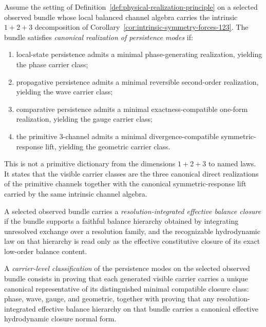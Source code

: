\begin{definition}
\label{def:canonical-sector-generation}
Assume the setting of Definition~\ref{def:physical-realization-principle} on a
selected observed bundle whose local balanced channel algebra carries the
intrinsic \(1+2+3\) decomposition of
Corollary~\ref{cor:intrinsic-symmetry-forces-123}. The bundle satisfies
\emph{canonical realization of persistence modes} if:
\begin{enumerate}[label=(\roman*), leftmargin=2em, itemsep=0.2em]
\item local-state persistence admits a minimal phase-generating realization,
      yielding the phase carrier class;
\item propagative persistence admits a minimal reversible second-order
      realization, yielding the wave carrier class;
\item comparative persistence admits a minimal exactness-compatible one-form
      realization, yielding the gauge carrier class;
\item the primitive \(3\)-channel admits a minimal divergence-compatible
      symmetric-response lift, yielding the geometric carrier class.
\end{enumerate}
This is not a primitive dictionary from the dimensions \(1+2+3\) to named
laws. It states that the visible carrier classes are the three canonical
direct realizations of the primitive channels together with the canonical
symmetric-response lift carried by the same intrinsic channel algebra.
\end{definition}

\begin{definition}
\label{def:resolution-integrated-effective-balance-closure}
A selected observed bundle carries a
\emph{resolution-integrated effective balance closure} if the bundle supports a
faithful balance hierarchy obtained by integrating unresolved exchange over a
resolution family, and the recognizable hydrodynamic law on that hierarchy is
read only as the effective constitutive closure of its exact low-order balance
content.
\end{definition}

\begin{definition}
\label{def:carrier-level-classification}
A \emph{carrier-level classification} of the persistence modes on the selected
observed bundle consists in proving that each generated visible carrier carries
a unique
canonical representative of its distinguished minimal compatible closure class:
phase, wave, gauge, and geometric, together with proving that any
resolution-integrated effective balance hierarchy on that bundle carries a
canonical effective hydrodynamic closure normal form.
\end{definition}

